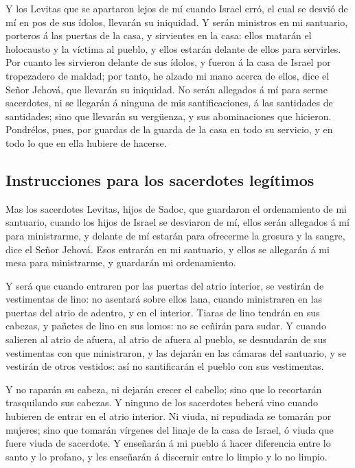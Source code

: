  Y los Levitas que se apartaron lejos de mí cuando Israel
erró, el cual se desvió de mí en pos de sus ídolos, llevarán su
iniquidad.  Y serán ministros en mi santuario, porteros á
las puertas de la casa, y sirvientes en la casa: ellos matarán el
holocausto y la víctima al pueblo, y ellos estarán delante de ellos para
servirles.  Por cuanto les sirvieron delante de sus
ídolos, y fueron á la casa de Israel por tropezadero de maldad; por
tanto, he alzado mi mano acerca de ellos, dice el Señor Jehová, que
llevarán su iniquidad.  No serán allegados á mí para
serme sacerdotes, ni se llegarán á ninguna de mis santificaciones, á las
santidades de santidades; sino que llevarán su vergüenza, y sus
abominaciones que hicieron.  Pondrélos, pues, por guardas
de la guarda de la casa en todo su servicio, y en todo lo que en ella
hubiere de hacerse.

\hypertarget{instrucciones-para-los-sacerdotes-leguxedtimos}{%
\subsection{Instrucciones para los sacerdotes
legítimos}\label{instrucciones-para-los-sacerdotes-leguxedtimos}}

 Mas los sacerdotes Levitas, hijos de Sadoc, que
guardaron el ordenamiento de mi santuario, cuando los hijos de Israel se
desviaron de mí, ellos serán allegados á mí para ministrarme, y delante
de mí estarán para ofrecerme la grosura y la sangre, dice el Señor
Jehová.  Esos entrarán en mi santuario, y ellos se
allegarán á mi mesa para ministrarme, y guardarán mi ordenamiento.

 Y será que cuando entraren por las puertas del atrio
interior, se vestirán de vestimentas de lino: no asentará sobre ellos
lana, cuando ministraren en las puertas del atrio de adentro, y en el
interior.  Tiaras de lino tendrán en sus cabezas, y
pañetes de lino en sus lomos: no se ceñirán para sudar. 
Y cuando salieren al atrio de afuera, al atrio de afuera al pueblo, se
desnudarán de sus vestimentas con que ministraron, y las dejarán en las
cámaras del santuario, y se vestirán de otros vestidos: así no
santificarán el pueblo con sus vestimentas.

 Y no raparán su cabeza, ni dejarán crecer el cabello;
sino que lo recortarán trasquilando sus cabezas.  Y
ninguno de los sacerdotes beberá vino cuando hubieren de entrar en el
atrio interior.  Ni viuda, ni repudiada se tomarán por
mujeres; sino que tomarán vírgenes del linaje de la casa de Israel, ó
viuda que fuere viuda de sacerdote.  Y enseñarán á mi
pueblo á hacer diferencia entre lo santo y lo profano, y les enseñarán á
discernir entre lo limpio y lo no limpio.

